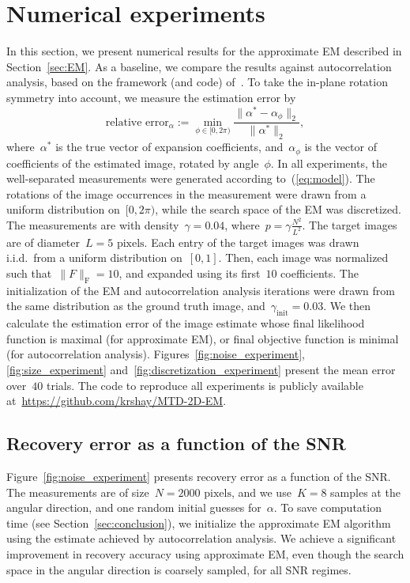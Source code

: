 \documentclass{article}
\begin{document}
\section{Numerical experiments}
\label{sec:numeric}
In this section, we present numerical results for the approximate EM described in Section~\ref{sec:EM}. As a baseline, we compare the results against autocorrelation analysis, based on the framework (and code) of~\cite{bendory2021multi, kreymer2021two}. To take the in-plane rotation symmetry into account, we measure the estimation error by
\begin{equation}
\label{eq:err_z}
\text{relative error}_{\alpha} := \min_{\phi \in [0, 2\pi)} \frac{\|\alpha^* - \alpha_{\phi}\|_2}{\|\alpha^*\|_2},
\end{equation}
where~$\alpha^*$ is the true vector of expansion coefficients, and~$\alpha_{\phi}$ is the vector of coefficients of the estimated image, rotated by angle~$\phi$. In all experiments, the well-separated measurements were generated according to~(\ref{eq:model}). The rotations of the image occurrences in the measurement were drawn from a uniform distribution on~$[0, 2\pi)$, while the search space of the EM was discretized. The measurements are with density~\mbox{$\gamma = 0.04$}, where~\mbox{$p = \gamma \frac{N^2}{L^2}$}. The target images are of diameter~\mbox{$L = 5 \text{ pixels}$}. Each entry of the target images was drawn i.i.d.\ from a uniform distribution on~$[0,1]$. Then, each image was normalized such that~\mbox{$\|F\|_\text{F} = 10$}, and expanded using its first~$10$ coefficients. The initialization of the EM and autocorrelation analysis iterations were drawn from the same distribution as the ground truth image, and~\mbox{$\gamma_{\text{init}} = 0.03$}. We then calculate the estimation error of the image estimate whose final likelihood function is maximal (for approximate EM), or final objective function is minimal (for autocorrelation analysis). Figures~\ref{fig:noise_experiment}, \ref{fig:size_experiment} and~\ref{fig:discretization_experiment} present the mean error over~$40$ trials. The code to reproduce all experiments is publicly available at~\url{https://github.com/krshay/MTD-2D-EM}.

\subsection{Recovery error as a function of the SNR}
\label{subsec:exp_SNR}
Figure~\ref{fig:noise_experiment} presents recovery error as a function of the SNR. The measurements are of size~\mbox{$N = 2000 \text{ pixels}$}, and we use~\mbox{$K = 8$} samples at the angular direction, and one random initial guesses for~$\alpha$. To save computation time (see Section~\ref{sec:conclusion}), we initialize the approximate EM algorithm using the estimate achieved by autocorrelation analysis. We achieve a significant improvement in recovery accuracy using approximate EM, even though the search space in the angular direction is coarsely sampled, for all SNR regimes.
\end{document}
